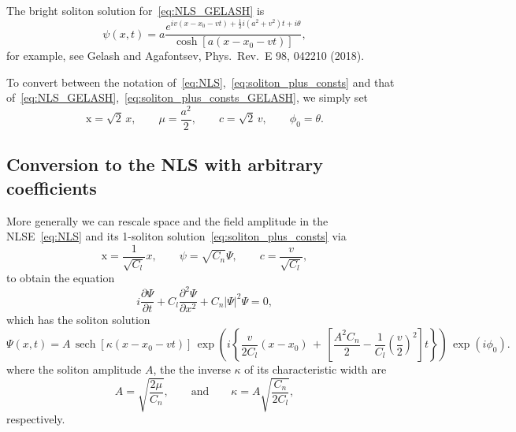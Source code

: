 \documentclass[11pt,a4paper]{article}
\DeclareMathOperator{\sech}{sech}
\begin{document}
The bright soliton solution for~\eqref{eq:NLS_GELASH} is
\begin{equation}
	\label{eq:soliton_plus_consts_GELASH}
	\psi(x ,t) = a \frac{e^{iv(x -x _0-vt) + \frac{1}{2}i(a^2+v^2)t + i\theta}}{\cosh\left[ a(x -x _0-vt) \right]},
\end{equation}
for example, see Gelash and  Agafontsev, Phys.\ Rev.\ E 98, 042210 (2018). 

To convert between the notation of~\eqref{eq:NLS},~\eqref{eq:soliton_plus_consts} and that of~\eqref{eq:NLS_GELASH},~\eqref{eq:soliton_plus_consts_GELASH}, we simply set
\begin{equation*}
	\mathrm{x} = \sqrt{2} \, x, 	\qquad 
	\mu= \frac{a^2}{2}, 		\qquad
	c=\sqrt{2} \, v,			\qquad
	\phi_0 = \theta.
\end{equation*}



\subsection{Conversion to the NLS with arbitrary coefficients}

More generally we can rescale space and the field amplitude in the NLSE~\eqref{eq:NLS} and its 1-soliton solution~\eqref{eq:soliton_plus_consts} via
\begin{equation*}
	\mathrm{x}     = \frac{1}{\sqrt{C_l}} x , \qquad
	\psi = \sqrt{C_n} \Psi, \qquad
	c     = \frac{v}{\sqrt{C_l}},
\end{equation*}
to obtain the equation
\begin{equation*}
	i\frac{\partial\Psi}{\partial t} + C_l \frac{\partial^2 \Psi}{\partial x ^2} + C_n |\Psi|^2 \Psi =0,
\end{equation*}
which has the soliton solution
\begin{equation*}
	\Psi(x ,t) = 
				A  \,
	 			\sech\!\left[  \kappa (x -x _0-vt)  \right]  \, 
	 			\exp\!\left(i \left\{  \frac{v}{2C_l} (x -x _0)  \,+ \, \left[ \frac{A^2C_n}{2}  -  \frac{1}{C_l} \left( \frac{v}{2}\right)^2 \right]t \right\} \right)\, 
	 			\exp(i\phi_0).
\end{equation*}
where the soliton amplitude $A$, the the inverse $\kappa$ of its characteristic width are
\begin{equation*}
	A = \sqrt{\frac{2\mu}{C_n}}, \qquad \mathrm{and} \qquad
	\kappa = A\sqrt{\frac{C_n}{2C_l}},
\end{equation*}
respectively.
\end{document}

